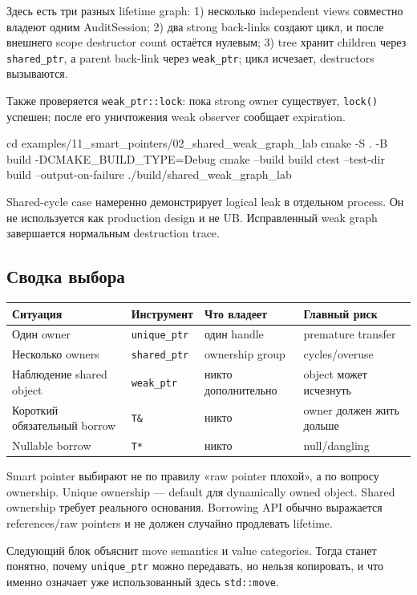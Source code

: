 Здесь есть три разных lifetime graph:
1) несколько independent views совместно владеют одним AuditSession; 2) два strong back-links создают цикл, и после внешнего scope destructor count остаётся нулевым; 3) tree хранит children через \texttt{shared\_ptr}, а parent back-link через \texttt{weak\_ptr}; цикл исчезает, destructors вызываются.

Также проверяется \texttt{weak\_ptr::lock}: пока strong owner существует,
\texttt{lock()} успешен; после его уничтожения weak observer сообщает expiration.

\begin{shellcode}
cd examples/11_smart_pointers/02_shared_weak_graph_lab
cmake -S . -B build -DCMAKE_BUILD_TYPE=Debug
cmake --build build
ctest --test-dir build --output-on-failure
./build/shared_weak_graph_lab
\end{shellcode}

Shared-cycle case намеренно демонстрирует logical leak в отдельном process.
Он не используется как production design и не UB. Исправленный weak
graph завершается нормальным destruction trace.

\subsection{Сводка выбора}

\begin{center}
\begin{tabularx}{\textwidth}{L{0.23\textwidth}YYY}
\toprule
Ситуация & Инструмент & Что владеет & Главный риск \\
\midrule
Один owner & \texttt{unique\_ptr} & один handle & premature transfer \\
Несколько owners & \texttt{shared\_ptr} & ownership group & cycles/overuse \\
Наблюдение shared object & \texttt{weak\_ptr} & никто дополнительно & object может исчезнуть \\
Короткий обязательный borrow & \texttt{T\&} & никто & owner должен жить дольше \\
Nullable borrow & \texttt{T*} & никто & null/dangling \\
\bottomrule
\end{tabularx}
\end{center}

\begin{importantbox}
Smart pointer выбирают не по правилу «raw pointer плохой», а по вопросу
ownership. Unique ownership --- default для dynamically owned object.
Shared ownership требует реального основания. Borrowing API обычно выражается
references/raw pointers и не должен случайно продлевать lifetime.
\end{importantbox}

Следующий блок объяснит move semantics и value categories. Тогда станет понятно,
почему \texttt{unique\_ptr} можно передавать, но нельзя копировать, и что именно
означает уже использованный здесь \texttt{std::move}.
